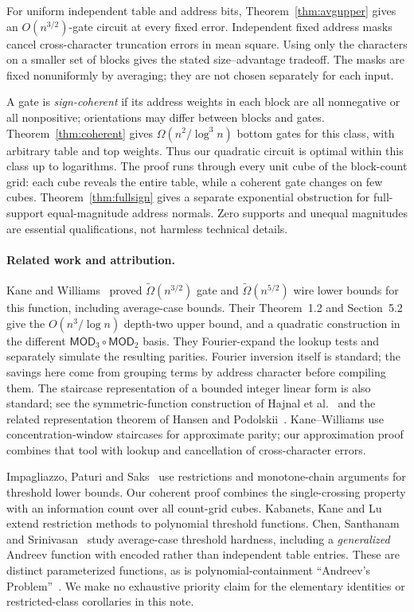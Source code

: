 \documentclass[11pt]{article}
\begin{document}
For uniform independent table and address bits, Theorem~\ref{thm:avgupper}
gives an $O(n^{3/2})$-gate circuit at every fixed error. Independent fixed
address masks cancel cross-character truncation errors in mean square.
Using only the characters on a smaller set of blocks gives the stated
size--advantage tradeoff. The masks are fixed nonuniformly by averaging;
they are not chosen separately for each input.

A gate is \emph{sign-coherent} if its address weights in each block are all
nonnegative or all nonpositive; orientations may differ between blocks
and gates. Theorem~\ref{thm:coherent} gives $\Omega(n^2/\log^3n)$ bottom
gates for this class, with arbitrary table and top weights. Thus our
quadratic circuit is optimal within this class up to logarithms. The proof
runs through every unit cube of the block-count grid: each cube reveals
the entire table, while a coherent gate changes on few cubes.
Theorem~\ref{thm:fullsign} gives a separate exponential obstruction for
full-support equal-magnitude address normals. Zero supports and unequal
magnitudes are essential qualifications, not harmless technical details.

\paragraph{Related work and attribution.}
Kane and Williams~\cite{KW} proved $\widetilde\Omega(n^{3/2})$ gate and
$\widetilde\Omega(n^{5/2})$ wire lower bounds for this function, including
average-case bounds. Their Theorem~1.2 and Section~5.2 give the
$O(n^3/\log n)$ depth-two upper bound, and a quadratic construction in the
different $\mathsf{MOD}_3\circ\mathsf{MOD}_2$ basis. They Fourier-expand the
lookup tests and separately simulate the resulting parities. Fourier
inversion itself is standard; the savings here come from grouping terms
by address character before compiling them. The staircase representation
of a bounded integer linear form is also standard; see the symmetric-function
construction of Hajnal et al.~\cite[Proposition~2.1]{HMPST} and the related
representation theorem of Hansen and Podolskii~\cite{HP}.
Kane--Williams use concentration-window staircases for approximate parity;
our approximation proof combines that tool with lookup and cancellation
of cross-character errors.

Impagliazzo, Paturi and Saks~\cite{IPS} use restrictions and monotone-chain
arguments for threshold lower bounds. Our coherent proof combines the
single-crossing property with an information count over all count-grid
cubes. Kabanets, Kane and Lu~\cite{KKL} extend restriction methods to
polynomial threshold functions. Chen, Santhanam and Srinivasan~\cite{CSS}
study average-case threshold hardness, including a \emph{generalized}
Andreev function with encoded rather than independent table entries.
These are distinct parameterized functions, as is polynomial-containment
``Andreev's Problem''~\cite{Pot}.
We make no exhaustive priority claim for the elementary identities or
restricted-class corollaries in this note.
\end{document}
